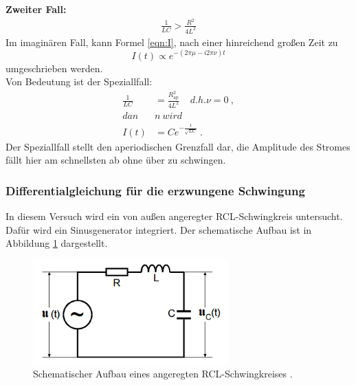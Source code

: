 \newline
\textbf{Zweiter Fall:}
\begin{align*}
	\frac{1}{LC} > \frac{R^2}{4L^2}
\end{align*}
Im imaginären Fall, kann Formel \ref{eqn:I}, nach einer hinreichend großen Zeit zu
\begin{equation}
	I(t) \propto e^{-(2 \pi \mu - i2 \pi \nu)t}
\end{equation}
umgeschrieben werden. \\
Von Bedeutung ist der Speziallfall:
\begin{align*}
	\frac{1}{LC} & = \frac{R_\text{ap}^2}{4L^2} \ \ \ \ \ d.h. \nu = 0 \ , \\
	dan&n \ wird \\
	I(t) & = C e^{- \frac{t}{\sqrt{LC}}} \ .
\end{align*}
Der Speziallfall stellt den aperiodischen Grenzfall dar, die Amplitude des Stromes fällt hier am schnellsten ab ohne über zu schwingen.

\subsubsection{Differentialgleichung für die erzwungene Schwingung}
In diesem Versuch wird ein von außen angeregter RCL-Schwingkreis untersucht. Dafür wird ein Sinusgenerator integriert. Der schematische Aufbau ist in Abbildung \ref{fig:aRCL} dargestellt.

\begin{figure}[H]
	\centering
	\includegraphics[height=4cm]{picture/Theorie2.PNG}
	\caption{Schematischer Aufbau eines angeregten RCL-Schwingkreises \cite[289]{sample}.}
	\label{fig:aRCL}
\end{figure}


